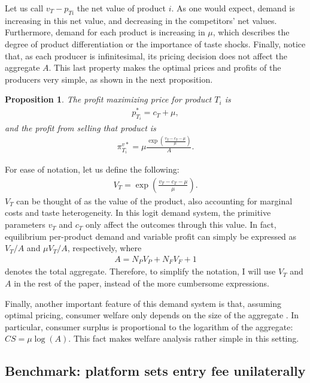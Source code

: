 \documentclass[a4paper]{article}
\newtheorem{proposition}{Proposition}
\begin{document}
Let us call $v_T - p_{Ti}$ the net value of product $i$.
As one would expect, demand is increasing in this net value, and decreasing in the competitors' net values.
Furthermore, demand for each product is increasing in $\mu$, which describes the degree of product differentiation or the importance of taste shocks.
Finally, notice that, as each producer is infinitesimal, its pricing decision does not affect the aggregate $A$.
This last property makes the optimal prices and profits of the producers very simple, as shown in the next proposition.
\begin{proposition}
    \label{prop:optimal_profit}
    The profit maximizing price for product $T_i$ is
    \begin{align*}
        p^*_{T_i} = c_T + \mu,
    \end{align*}
    and the profit from selling that product is
    \begin{align}
        \pi^{v*}_{T_i} = \mu \frac{\exp \left( \frac{v_T - c_T - \mu}{\mu} \right)}{A}.
        \label{eq:optimal_profit}
    \end{align}
\end{proposition}

For ease of notation, let us define the following:
\begin{align*}
    V_T = \exp \left( \frac{v_T - c_T - \mu}{\mu} \right).
\end{align*}
$V_T$ can be thought of as the value of the product, also accounting for marginal costs and taste heterogeneity.
In this logit demand system, the primitive parameters $v_T$ and $c_T$ only affect the outcomes through this value.
In fact, equilibrium per-product demand and variable profit can simply be expressed as $V_T/ A$ and $\mu V_T/ A$, respectively, where
\begin{align}
    A = N_P V_P + N_F V_F + 1
    \label{eq:aggregate_simple}
\end{align}
denotes the total aggregate.
Therefore, to simplify the notation, I will use $V_T$ and $A$ in the rest of the paper, instead of the more cumbersome expressions.

Finally, another important feature of this demand system is that, assuming optimal pricing, consumer welfare only depends on the size of the aggregate \parencite{anderson2020aggregative}.
In particular, consumer surplus is proportional to the logarithm of the aggregate: $CS = \mu \log(A)$. This fact makes welfare analysis rather simple in this setting.

\subsection{Benchmark: platform sets entry fee unilaterally}
\label{sec:results_benchmark}
\end{document}
